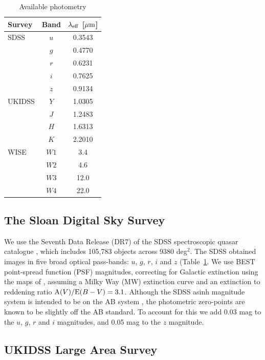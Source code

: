 \begin{table}
  \small
  \centering
  \begin{tabular}{l c c}
    \hline 
    Survey & Band & $\lambda_{\rm eff}$ [$\mu{\rm m}$] \\
    \hline 
    SDSS & $u$ & 0.3543 \\
         & $g$ & 0.4770 \\
         & $r$ & 0.6231 \\
         & $i$ & 0.7625 \\
         & $z$ & 0.9134 \\
    UKIDSS & $Y$ & 1.0305 \\
           & $J$ & 1.2483 \\
           & $H$ & 1.6313 \\
           & $K$ & 2.2010 \\
    WISE & $W1$ & 3.4 \\
         & $W2$ & 4.6 \\
         & $W3$ & 12.0 \\
         & $W4$ & 22.0 \\           
    \hline
  \end{tabular}
  \caption{Available photometry}
  \label{tab:photometry}
\end{table}

\subsection{The Sloan Digital Sky Survey}

We use the Seventh Data Release (DR7) of the \ac{SDSS} spectroscopic quasar catalogue \citep{schneider10}, which includes 105,783 objects across 9380 deg$^2$. 
The \ac{SDSS} obtained images in five broad optical pass-bands: $u$, $g$, $r$, $i$ and $z$ (Table~\ref{tab:photometry}.  
We use BEST point-spread function (PSF) magnitudes, correcting for Galactic extinction using the maps of \citet{schlegel98}, assuming a Milky Way (MW) extinction curve \citep{pei92} and an extinction to reddening ratio ${\rm A}(V) / {\rm E}(B-V) = 3.1$. 
Although the SDSS asinh magnitude system is intended to be on the AB system \citep{oke83}, the photometric zero-points are known to be slightly off the AB standard. 
To account for this we add 0.03 mag to the $u$, $g$, $r$ and $i$ magnitudes, and 0.05 mag to the $z$ magnitude.  

\subsection{UKIDSS Large Area Survey}

